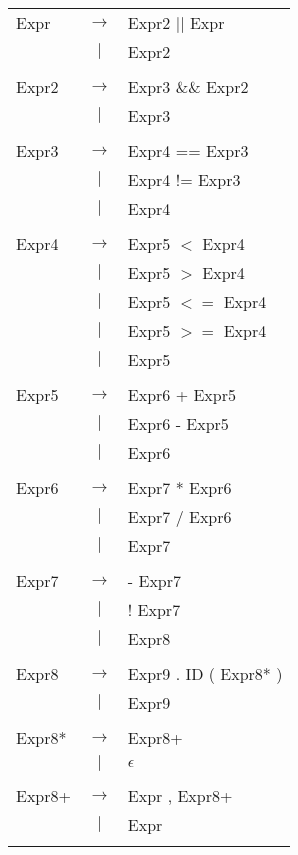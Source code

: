 \documentclass{article}
\begin{document}
\begin{tabular}{ l c l }

	Expr & $\rightarrow$ & Expr2 $||$ Expr \\
	&$|$& Expr2 \\
	\\

	Expr2 & $\rightarrow$ & Expr3 $\&\&$ Expr2 \\
	&$|$& Expr3 \\
	\\

	Expr3 & $\rightarrow$ & Expr4 == Expr3 \\
	&$|$& Expr4 != Expr3 \\
	&$|$& Expr4 \\
	\\

	Expr4 & $\rightarrow$ & Expr5 $<$ Expr4 \\
	&$|$& Expr5 $>$ Expr4 \\
	&$|$& Expr5 $<=$ Expr4 \\
	&$|$& Expr5 $>=$ Expr4 \\
	&$|$& Expr5 \\
	\\

	Expr5 & $\rightarrow$ & Expr6 + Expr5 \\
	&$|$& Expr6 - Expr5 \\
	&$|$& Expr6 \\
	\\

	Expr6 & $\rightarrow$ & Expr7 * Expr6 \\
	&$|$& Expr7 / Expr6 \\
	&$|$& Expr7 \\
	\\

	Expr7 & $\rightarrow$ & - Expr7 \\
	&$|$& ! Expr7 \\
	&$|$& Expr8 \\
	\\

	Expr8 & $\rightarrow$ & Expr9 . ID ( Expr8* ) \\
	&$|$& Expr9 \\
	\\

	Expr8* & $\rightarrow$ & Expr8+ \\
  	& $|$ & $\epsilon$ \\
	\\

	Expr8+ & $\rightarrow$ & Expr , Expr8+ \\
  	& $|$ & Expr \\
	\\


\end{tabular}
\end{document}
